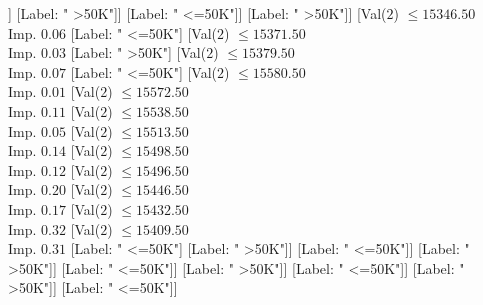 \documentclass[margin=10pt]{standalone}
\begin{document}
\begin{forest}
																																							[Val($2$) $ \leq 15163.50$ \\ Imp. $1.00$
																																								[Label: " >50K"]
																																								[Label: " <=50K"]]
																																							[Label: " >50K"]]
																																						[Label: " <=50K"]]
																																					[Label: " >50K"]]
																																				[Val($2$) $ \leq 15346.50$ \\ Imp. $0.06$
																																					[Label: " <=50K"]
																																					[Val($2$) $ \leq 15371.50$ \\ Imp. $0.03$
																																						[Label: " >50K"]
																																						[Val($2$) $ \leq 15379.50$ \\ Imp. $0.07$
																																							[Label: " <=50K"]
																																							[Val($2$) $ \leq 15580.50$ \\ Imp. $0.01$
																																								[Val($2$) $ \leq 15572.50$ \\ Imp. $0.11$
																																									[Val($2$) $ \leq 15538.50$ \\ Imp. $0.05$
																																										[Val($2$) $ \leq 15513.50$ \\ Imp. $0.14$
																																											[Val($2$) $ \leq 15498.50$ \\ Imp. $0.12$
																																												[Val($2$) $ \leq 15496.50$ \\ Imp. $0.20$
																																													[Val($2$) $ \leq 15446.50$ \\ Imp. $0.17$
																																														[Val($2$) $ \leq 15432.50$ \\ Imp. $0.32$
																																															[Val($2$) $ \leq 15409.50$ \\ Imp. $0.31$
																																																[Label: " <=50K"]
																																																[Label: " >50K"]]
																																															[Label: " <=50K"]]
																																														[Label: " >50K"]]
																																													[Label: " <=50K"]]
																																												[Label: " >50K"]]
																																											[Label: " <=50K"]]
																																										[Label: " >50K"]]
																																									[Label: " <=50K"]]

\end{forest}
\end{document}
